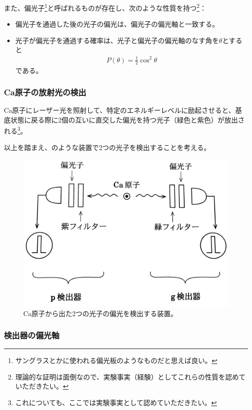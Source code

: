 \documentclass[10pt,b5paper,papersize,dvipdfmx]{jsbook}
\begin{document}
\par
また、偏光子\footnote{
  サングラスとかに使われる偏光板のようなものだと思えば良い。
}と呼ばれるものが存在し、次のような性質を持つ\footnote{
  理論的な証明は面倒なので、実験事実（経験）としてこれらの性質を認めていただきたい。
}：
\begin{itemize}
  \item 偏光子を通過した後の光子の偏光は、偏光子の偏光軸と一致する。
  \item 光子が偏光子を通過する確率は、光子と偏光子の偏光軸のなす角を$\theta$とすると
    \begin{align}
      P(\theta) = \frac12 \cos^2\theta
      \label{eq:P(theta)}
    \end{align}
    である。
\end{itemize}

%
\subsubsection{Ca原子の放射光の検出} %

Ca原子にレーザー光を照射して、特定のエネルギーレベルに励起させると、基底状態に戻る際に2個の互いに直交した偏光を持つ光子（緑色と紫色）が放出される\footnote{
  これについても、ここでは実験事実として認めていただきたい。
}。\par
以上を踏まえ、のような装置で2つの光子を検出することを考える。

\begin{figure}[htb]
  \centering
  \includegraphics[width=.5\textwidth]{nkym/fig/souchi.jpeg}
  \caption{Ca原子から出た2つの光子の偏光を検出する装置。} %
  \label{fig:Ca-machine}
\end{figure}

%
\subsubsection{検出器の偏光軸} %
\end{document}
